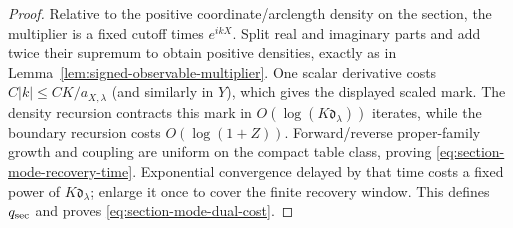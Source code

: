 \documentclass[11pt]{article}
\begin{document}
\begin{proof}
Relative to the positive coordinate/arclength density on the section, the
multiplier is a fixed cutoff times $e^{ikX}$.  Split real and imaginary parts
and add twice their supremum to obtain positive densities, exactly as in
Lemma~\ref{lem:signed-observable-multiplier}.  One scalar derivative costs
$C|k|\le CK/a_{X,\lambda}$ (and similarly in $Y$), which gives the displayed
scaled mark.  The density recursion contracts this mark in
$O(\log(K\mathfrak d_\lambda))$ iterates, while the boundary recursion costs
$O(\log(1+Z))$.  Forward/reverse proper-family growth and coupling are uniform
on the compact table class, proving \eqref{eq:section-mode-recovery-time}.
Exponential convergence delayed by that time costs a fixed power of
$K\mathfrak d_\lambda$; enlarge it once to cover the finite recovery window.
This defines $q_{\rm sec}$ and proves \eqref{eq:section-mode-dual-cost}.
\end{proof}
\end{document}
